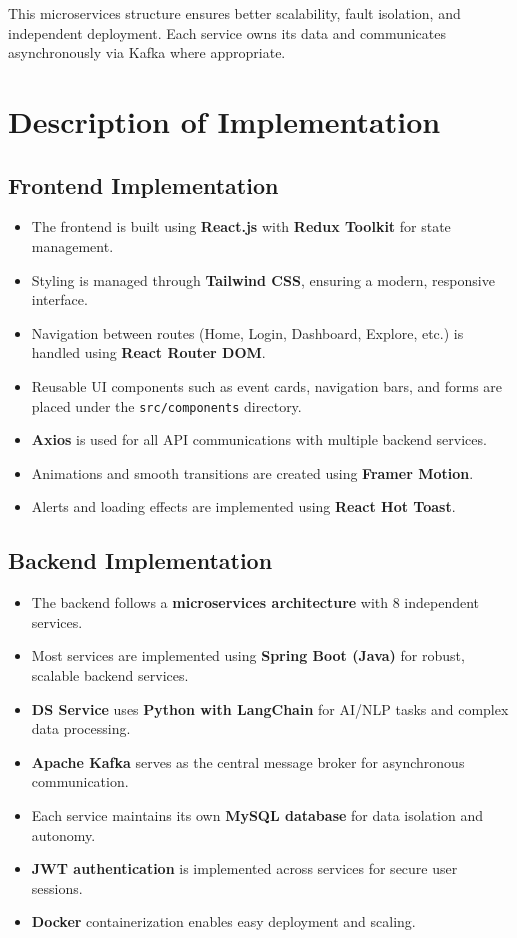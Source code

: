 \documentclass[12pt,a4paper]{report}
\begin{document}
\noindent
This microservices structure ensures better scalability, fault isolation, and
independent deployment. Each service owns its data and communicates
asynchronously via Kafka where appropriate.

\section{Description of Implementation}

\subsection*{Frontend Implementation}
\begin{itemize}
    \item The frontend is built using \textbf{React.js} with \textbf{Redux Toolkit} for
          state management.
    \item Styling is managed through \textbf{Tailwind CSS}, ensuring a modern, responsive
          interface.
    \item Navigation between routes (Home, Login, Dashboard, Explore, etc.) is handled
          using \textbf{React Router DOM}.
    \item Reusable UI components such as event cards, navigation bars, and forms are
          placed under the \texttt{src/components} directory.
    \item \textbf{Axios} is used for all API communications with multiple backend services.
    \item Animations and smooth transitions are created using \textbf{Framer Motion}.
    \item Alerts and loading effects are implemented using \textbf{React Hot Toast}.
\end{itemize}

\subsection*{Backend Implementation}
\begin{itemize}
    \item The backend follows a \textbf{microservices architecture} with 8 independent
          services.
    \item Most services are implemented using \textbf{Spring Boot (Java)} for robust,
          scalable backend services.
    \item \textbf{DS Service} uses \textbf{Python with LangChain} for AI/NLP tasks and complex data processing.
    \item \textbf{Apache Kafka} serves as the central message broker for asynchronous communication.
    \item Each service maintains its own \textbf{MySQL database} for data isolation and
          autonomy.
    \item \textbf{JWT authentication} is implemented across services for secure user sessions.
    \item \textbf{Docker} containerization enables easy deployment and scaling.
\end{itemize}
\end{document}
